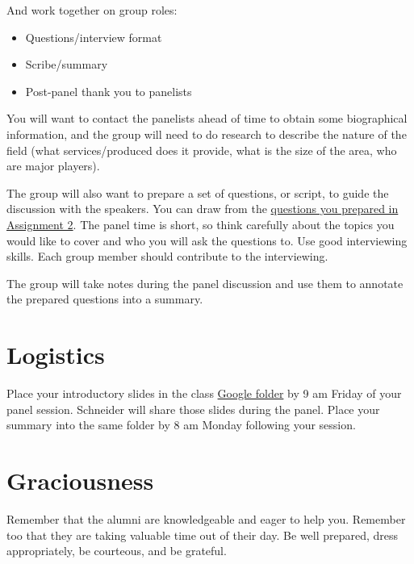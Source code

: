 \documentclass[11pt]{article}
\begin{document}
And work together on group roles:
\begin{itemize}
\item Questions/interview format
\item Scribe/summary
\item Post-panel thank you to panelists
\end{itemize}

You will want to contact the panelists ahead of time to obtain some biographical information, and the group will need to do research to describe the nature of the field (what services/produced does it provide, what is the size of the area, who are major players).

The group will also want to prepare a set of questions, or script, to guide the discussion with the speakers. You can draw from the \href{https://docs.google.com/document/d/1eUqnfeW1NTqqTqEzBxjCo6u20dFwN1kRAMNXPG9ioL0/edit?usp=sharing}{questions you prepared in Assignment 2}. The panel time is short, so think carefully about the topics you would like to cover and who you will ask the questions to. Use good interviewing skills. Each group member should  contribute to the interviewing. 

The group will take notes during the panel discussion and use them to annotate the prepared questions into a summary.

\section{Logistics}
\label{sec:org7a098ed}
Place your introductory slides in the class \href{https://drive.google.com/drive/folders/12p1B5icXV4FetwMoPTR7hkxTTPMj53qA?usp=sharing}{Google folder} by 9 am Friday of your panel session. Schneider will share those slides during the panel. Place your summary into the same folder by 8 am Monday following your session. 

\section{Graciousness}
\label{sec:org11f9ac3}
Remember that the alumni are knowledgeable and eager to help you. Remember too that they are taking valuable time out of their day. Be well prepared, dress appropriately, be courteous, and be grateful. 
\end{document}
